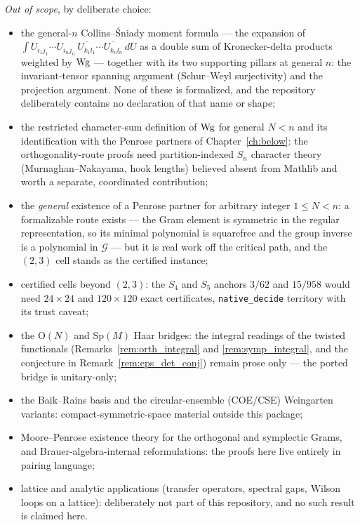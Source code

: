 \emph{Out of scope}, by deliberate choice:
\begin{itemize}
  \item the general-$n$ Collins--\'Sniady moment formula --- the expansion of
    $\int U_{i_1j_1}\cdots U_{i_nj_n}\,
    \overline{U_{k_1l_1}}\cdots\overline{U_{k_nl_n}}\,dU$ as a double sum of
    Kronecker-delta products weighted by $\operatorname{Wg}$ --- together with its two
    supporting pillars at general $n$: the invariant-tensor spanning argument
    (Schur--Weyl surjectivity) and the projection argument. None of these is
    formalized, and the repository deliberately contains no declaration of
    that name or shape;
  \item the restricted character-sum definition of $\operatorname{Wg}$ for general $N<n$ and its
    identification with the Penrose partners of Chapter~\ref{ch:below}: the
    orthogonality-route proofs need partition-indexed $S_n$ character theory
    (Murnaghan--Nakayama, hook lengths) believed absent from Mathlib and worth a
    separate, coordinated contribution;
  \item the \emph{general} existence of a Penrose partner for arbitrary integer
    $1\le N<n$: a formalizable route exists --- the Gram element is symmetric in
    the regular representation, so its minimal polynomial is squarefree and the
    group inverse is a polynomial in $\mathcal G$ --- but it is real work off the
    critical path, and the $(2,3)$ cell stands as the certified instance;
  \item certified cells beyond $(2,3)$: the $S_4$ and $S_5$ anchors $3/62$ and
    $15/958$ would need $24\times24$ and $120\times120$ exact certificates,
    \texttt{native\_decide} territory with its trust caveat;
  \item the $\mathrm O(N)$ and $\mathrm{Sp}(M)$ Haar bridges: the integral
    readings of the twisted functionals
    (Remarks~\ref{rem:orth_integral} and \ref{rem:symp_integral}, and the
    conjecture in Remark~\ref{rem:eps_det_conj}) remain prose only --- the
    ported bridge is unitary-only;
  \item the Baik--Rains basis and the circular-ensemble
    (COE/CSE) Weingarten variants: compact-symmetric-space material
    outside this package;
  \item Moore--Penrose existence theory for the orthogonal and symplectic Grams,
    and Brauer-algebra-internal reformulations: the proofs here live entirely in
    pairing language;
  \item lattice and analytic applications (transfer operators, spectral gaps,
    Wilson loops on a lattice): deliberately not part of this repository,
    and no such result is claimed here.
\end{itemize}


